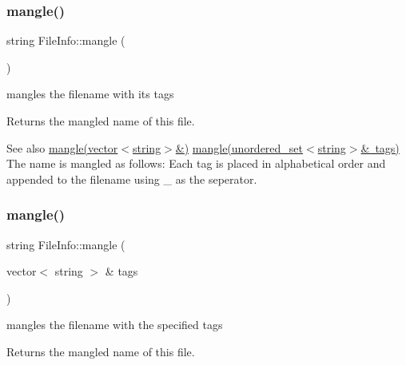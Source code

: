 \subsubsection{\texorpdfstring{mangle()}{mangle()}\hspace{0.1cm}{\footnotesize\ttfamily [1/3]}}
{\footnotesize\ttfamily string File\+Info\+::mangle (\begin{DoxyParamCaption}{ }\end{DoxyParamCaption})}



mangles the filename with its tags 

\begin{DoxyReturn}{Returns}
the mangled name of this file. 
\end{DoxyReturn}
\begin{DoxySeeAlso}{See also}
\mbox{\hyperlink{classFileInfo_a105ad751f21bead6fc2a76e79cb3b701}{mangle(vector$<$string$>$\&)}} \mbox{\hyperlink{classFileInfo_aec8a60addbed54097f6cac0a6a516717}{mangle(unordered\+\_\+set$<$string$>$\& tags)}} The name is mangled as follows\+: Each tag is placed in alphabetical order and appended to the filename using \textquotesingle{}\+\_\+\textquotesingle{} as the seperator. 
\end{DoxySeeAlso}
\mbox{\label{classFileInfo_a105ad751f21bead6fc2a76e79cb3b701}} 
\subsubsection{\texorpdfstring{mangle()}{mangle()}\hspace{0.1cm}{\footnotesize\ttfamily [2/3]}}
{\footnotesize\ttfamily string File\+Info\+::mangle (\begin{DoxyParamCaption}\item[{vector$<$ string $>$ \&}]{tags }\end{DoxyParamCaption})}



mangles the filename with the specified tags 

\begin{DoxyReturn}{Returns}
the mangled name of this file. 
\end{DoxyReturn}

